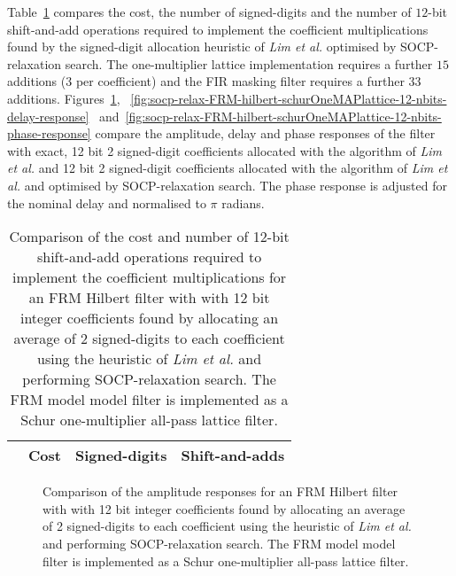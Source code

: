 \documentclass[a4paper,twoside,10pt,english]{report}
\begin{document}
Table~\ref{tab:socp-relax-FRM-hilbert-schurOneMAPlattice-12-nbits-cost-summary}
compares the cost, the number of signed-digits and the number of $12$-bit
shift-and-add operations required to implement the coefficient multiplications
found by the signed-digit allocation heuristic of \emph{Lim et al.} optimised
by SOCP-relaxation search. The one-multiplier lattice implementation requires
a further $15$ additions ($3$ per coefficient) and the FIR masking filter
requires a further $33$ additions.
Figures~\ref{fig:socp-relax-FRM-hilbert-schurOneMAPlattice-12-nbits-amplitude-response},
~\ref{fig:socp-relax-FRM-hilbert-schurOneMAPlattice-12-nbits-delay-response}
~and~\ref{fig:socp-relax-FRM-hilbert-schurOneMAPlattice-12-nbits-phase-response}
compare the amplitude, delay and phase responses of the filter with exact, 12
bit 2 signed-digit coefficients allocated with the algorithm of \emph{Lim et
  al.} and 12 bit 2 signed-digit coefficients allocated with the algorithm of
\emph{Lim et al.} and optimised by SOCP-relaxation search. The phase response
is adjusted for the nominal delay and normalised to $\pi$ radians. 
\begin{table}[!htbp]
\centering
\begin{threeparttable}
\begin{tabular}{lccc}  \\ \toprule
& Cost&Signed-digits&Shift-and-adds\\ \midrule

\bottomrule
\end{tabular}
\end{threeparttable}
\caption[Summary of cost results for the FRM Schur one-multiplier lattice 
Hilbert filter SOCP-relaxation example with 12 bit 2 signed digit coefficients]
{Comparison of the cost and number of 12-bit shift-and-add operations required
  to implement the coefficient multiplications for an FRM Hilbert filter with
  with 12 bit integer coefficients found by allocating an average of 2
  signed-digits to each coefficient using the heuristic of \emph{Lim et al.}
  and performing SOCP-relaxation search. The FRM model model filter is
  implemented as a Schur one-multiplier all-pass lattice filter.}
\label{tab:socp-relax-FRM-hilbert-schurOneMAPlattice-12-nbits-cost-summary}
\end{table}

\begin{figure}[!htbp]
\begin{center}
\scalebox{0.7}{}
\caption{Comparison of the amplitude responses for an FRM Hilbert filter with
  with 12 bit integer coefficients found by allocating an average of 2
  signed-digits to each coefficient using the heuristic of \emph{Lim et al.}
  and performing SOCP-relaxation search. The FRM model model filter is
  implemented as a Schur one-multiplier all-pass lattice filter.}
\label{fig:socp-relax-FRM-hilbert-schurOneMAPlattice-12-nbits-amplitude-response}
\end{center}
\end{figure}
\end{document}
